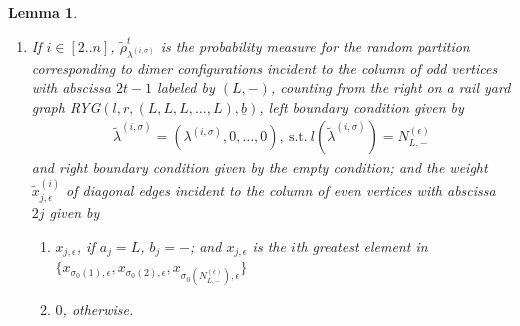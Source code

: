 \documentclass[10pt,a4paper]{amsart}
\newtheorem{lemma}{Lemma}
\newcommand\si{\sigma}
\begin{document}
\begin{lemma}
\begin{enumerate}
\begin{enumerate}
\item $x_{j,\epsilon}$, if one of the following two conditions holds
\begin{enumerate}
\item $(a_j,b_j)=(L,-)$, and $x_{j,\epsilon}=x_{\si_0(1),\epsilon}$; or
\item $(a_j,b_j)\neq(L,-)$
\end{enumerate}
\item $0$, otherwise.
\end{enumerate}
\item If $i\in[2..n]$,
$\tilde{\rho}^{t}_{\lambda^{(i,\si)}}$  
is the probability measure for the random partition  corresponding to dimer configurations incident to the  column of odd vertices with abscissa $2t-1$ labeled by $(L,-)$, counting from the right on a rail yard graph RYG$(l,r,(L,L,L,\ldots,L),\underline{b})$, left boundary condition given by 
\begin{align*}
\tilde{\lambda}^{(i,\si)}=(\lambda^{(i,\si)},0,\ldots,0),\ \mathrm{s.t.}\ l(\tilde{\lambda}^{(i,\si)})=N_{L,-}^{(\epsilon
)}
\end{align*}
and right boundary condition given by the empty condition; and the weight $\tilde{x}_{j,\epsilon}^{(i)}$ of diagonal edges incident to the column of even vertices with abscissa $2j$ given by
\begin{enumerate}
\item $x_{j,\epsilon}$, if $a_j=L$, $b_j=-$; and $x_{j,\epsilon}$ is the $i$th greatest element in $\{x_{\si_0(1),\epsilon},x_{\si_0(2),\epsilon},x_{\si_0(N_{L,-}^{(\epsilon)}),\epsilon}\}$
\item $0$, otherwise.
\end{enumerate}
\end{enumerate}
\end{lemma}
\end{document}

